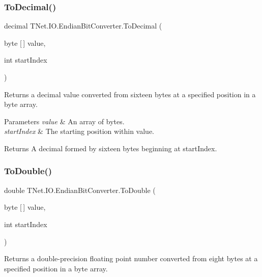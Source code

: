 \subsubsection{\texorpdfstring{To\+Decimal()}{ToDecimal()}}
{\footnotesize\ttfamily decimal T\+Net.\+I\+O.\+Endian\+Bit\+Converter.\+To\+Decimal (\begin{DoxyParamCaption}\item[{byte \mbox{[}$\,$\mbox{]}}]{value,  }\item[{int}]{start\+Index }\end{DoxyParamCaption})}



Returns a decimal value converted from sixteen bytes at a specified position in a byte array. 


\begin{DoxyParams}{Parameters}
{\em value} & An array of bytes.\\
\hline
{\em start\+Index} & The starting position within value.\\
\hline
\end{DoxyParams}
\begin{DoxyReturn}{Returns}
A decimal formed by sixteen bytes beginning at start\+Index.
\end{DoxyReturn}
\mbox{\label{class_t_net_1_1_i_o_1_1_endian_bit_converter_a46f2f5e1fee257fae892768be7fbd24d}} 
\subsubsection{\texorpdfstring{To\+Double()}{ToDouble()}}
{\footnotesize\ttfamily double T\+Net.\+I\+O.\+Endian\+Bit\+Converter.\+To\+Double (\begin{DoxyParamCaption}\item[{byte \mbox{[}$\,$\mbox{]}}]{value,  }\item[{int}]{start\+Index }\end{DoxyParamCaption})}



Returns a double-\/precision floating point number converted from eight bytes at a specified position in a byte array. 


